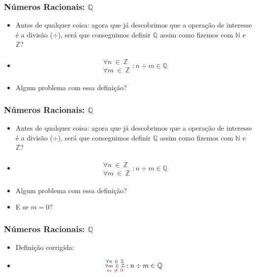 \documentclass[usenames,dvipsnames,svgnames]{beamer}
\begin{document}
\begin{frame}	
	\frametitle{Números Racionais: $\mathbb{Q}$}

	\begin{itemize}
		\item Antes de qualquer coisa: agora que já descobrimos que a operação de interesse é a divisão ($\div$), será que conseguimos definir $\mathbb{Q}$ assim como fizemos com $\mathbb{N}$ e $\mathbb{Z}$?
		\item
		\begin{equation}
		\begin{aligned}
			\substack{\forall n ~\in~ \mathbb{Z} \\ \forall m ~\in~ \mathbb{Z}}: n \div m \in \mathbb{Q}
		\end{aligned}
		\end{equation}
		\item Algum problema com essa definição?
	\end{itemize}
\end{frame}

\begin{frame}	
	\frametitle{Números Racionais: $\mathbb{Q}$}

	\begin{itemize}
		\item Antes de qualquer coisa: agora que já descobrimos que a operação de interesse é a divisão ($\div$), será que conseguimos definir $\mathbb{Q}$ assim como fizemos com $\mathbb{N}$ e $\mathbb{Z}$?
		\item
		\begin{equation}
		\begin{aligned}
			\substack{\forall n ~\in~ \mathbb{Z} \\ \forall m ~\in~ \mathbb{Z}}: n \div m \in \mathbb{Q}
		\end{aligned}
		\end{equation}
		\item Algum problema com essa definição?
		\item {\color{red} E se $m = 0$?}
	\end{itemize}
\end{frame}

\begin{frame}	
	\frametitle{Números Racionais: $\mathbb{Q}$}

	\begin{itemize}
		\item Definição corrigida:
		\item
		\begin{equation}
		\begin{aligned}
			\substack{\forall n ~\in~ \mathbb{Z} \\ \forall m ~\in~ \mathbb{Z} \\ {\color{red}m ~\neq~ 0}}: n \div m \in \mathbb{Q}
		\end{aligned}
		\end{equation}
	\end{itemize}
\end{frame}
\end{document}
